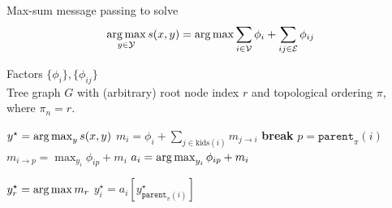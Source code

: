 \begin{algorithm} 
\caption[max-sum inference]{Max-sum message passing to solve 
$$\mathop{\arg\max}_{y \in \mathcal{Y}} s(x,y) = \mathop{\arg\max} \sum_{i \in \mathcal{V}} \phi_i + \sum_{ij \in \mathcal{E}} \phi_{ij}$$} 
\label{alg:max-inference} 
\begin{algorithmic} 

\REQUIRE $ $ \\ 
Factors $\{\phi_i\}, \{\phi_{ij}\}$\\
Tree graph $G$ with (arbitrary) root node index $r$ and topological ordering $\pi$, where $\pi_n = r$.

\ENSURE $y^\star = \mathop{\arg\max}_{y} s(x,y)$ 
\STATE
$m_i = \phi_i + \sum_{j \in \text{kids}(i)} m_{j \rightarrow i}$
 \STATE \textbf{break} \ENDIF
\STATE
$p = \texttt{parent}_\pi(i) $
\STATE
$m_{i \rightarrow p} = \max_{y_i} \phi_{ip} + m_i$
\STATE
$a_i = \mathop{\arg\max}_{y_i} \phi_{ip} + m_i$
\ENDFOR

\STATE
$y^\star_r = \mathop{\arg\max} m_r$
\STATE $y^\star_i = a_i\left[y^\star_{\texttt{parent}_\pi(i)}\right]$
\ENDFOR

\end{algorithmic} 
\end{algorithm}

